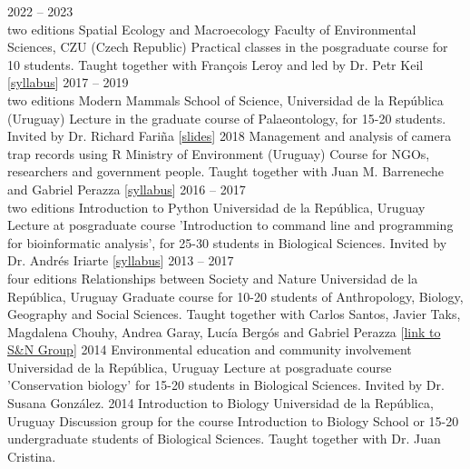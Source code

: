 \documentclass[9pt]{developercv} %
\begin{document}

\begin{entrylist}
	\entry
		{2022 -- 2023\\\footnotesize{two editions}}
		{Spatial Ecology and Macroecology}
		{Faculty of Environmental Sciences, CZU (Czech Republic)}
		{Practical classes in the posgraduate course for 10 students. Taught together with François Leroy and led by Dr. Petr Keil [\href{https://petrkeil.github.io/courses/post/2022/09/09/Spatial_ecology.html}{syllabus}]}
	\entry
		{2017 -- 2019\\\footnotesize{two editions}}
		{Modern Mammals}
		{School of Science, Universidad de la Rep\'{u}blica (Uruguay)}
		{Lecture in the graduate course of Palaeontology, for 15-20 students. Invited by Dr. Richard Fari\~{n}a [\href{https://flograttarola.com/pdf/mamiferos_julana.pdf}{slides}]}
	\entry
		{2018}
		{Management and analysis of camera trap records using R}
		{Ministry of Environment (Uruguay)}
		{Course for NGOs, researchers and government people. Taught together with Juan M. Barreneche and Gabriel Perazza [\href{https://github.com/bienflorencia/curso_camtrapR}{syllabus}]}
	\entry
		{2016 -- 2017\\\footnotesize{two editions}}
		{Introduction to Python}
		{Universidad de la Rep\'{u}blica, Uruguay}
		{Lecture at posgraduate course 'Introduction to command line and programming for bioinformatic analysis', for 25-30 students in Biological Sciences. Invited by Dr. Andr\'{e}s Iriarte [\href{https://github.com/bienflorencia/clases_python}{syllabus}]}
	\entry
		{2013 -- 2017\\\footnotesize{four editions}}
		{Relationships between Society and Nature}
		{Universidad de la Rep\'{u}blica, Uruguay}
		{Graduate course for 10-20 students of Anthropology, Biology, Geography and Social Sciences. Taught together with Carlos Santos, Javier Taks, Magdalena Chouhy, Andrea Garay, Luc\'{i}a Berg\'{o}s and Gabriel Perazza [\href{https://udelar.edu.uy/retema/actividades/grupos-de-trabajo/}{link to S\&N Group}]}
	\entry
		{2014}
		{Environmental education and community involvement}
		{Universidad de la Rep\'{u}blica, Uruguay}
		{Lecture at posgraduate course 'Conservation biology' for 15-20 students in Biological Sciences. Invited by Dr. Susana Gonz\'{a}lez. }
	\entry
		{2014}
		{Introduction to Biology}
		{Universidad de la Rep\'{u}blica, Uruguay}
		{Discussion group for the course Introduction to Biology School or 15-20 undergraduate students of Biological Sciences. Taught together with Dr. Juan Cristina.}
\end{entrylist}
\end{document}
